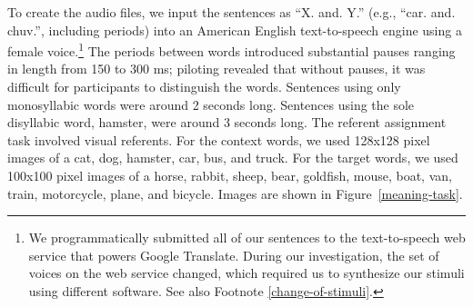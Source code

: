 \documentclass[man,floatsintext]{apa6}
\begin{document}
To create the audio files, we input the sentences as ``X. and. Y.'' (e.g., ``car. and. chuv.'', including periods) into an American English text-to-speech engine using a female voice.\footnote{\label{tts} We programmatically submitted all of our sentences to the text-to-speech web service that powers Google Translate. During our investigation, the set of voices on the web service changed, which required us to synthesize our stimuli using different software. See also Footnote \ref{change-of-stimuli}.} The periods between words introduced substantial pauses ranging in length from 150 to 300 ms; piloting revealed that without pauses, it was difficult for participants to distinguish the words. Sentences using only monosyllabic words were around 2 seconds long. Sentences using the sole disyllabic word, hamster, were around 3 seconds long.  The referent assignment task involved visual referents. For the context words, we used 128x128 pixel images of a cat, dog, hamster, car, bus, and truck. For the target words, we used 100x100 pixel images of a horse, rabbit, sheep, bear, goldfish, mouse, boat, van, train, motorcycle, plane, and bicycle. Images are shown in Figure~\ref{meaning-task}.
\end{document}
